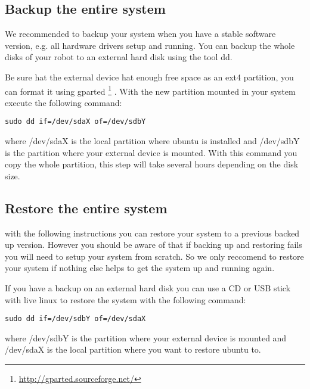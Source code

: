 \subsection{Backup the entire system}  
We recommended to backup your system when you have a stable software version, e.g. all hardware drivers setup and running. You can backup the whole disks of your robot to an external hard disk using the tool dd.

Be sure hat the external device hat enough free space as an ext4 partition, you can format it using gparted \footnote{\url{http://gparted.sourceforge.net/}} . With the new partition mounted in your system execute the following command:
\begin{lstlisting}
sudo dd if=/dev/sdaX of=/dev/sdbY
\end{lstlisting}
where /dev/sdaX is the local partition where ubuntu is installed and /dev/sdbY is the partition where your external device is mounted. With this command you copy the whole partition, this step will take several hours depending on the disk size.

\subsection{Restore the entire system}
with the following instructions you can restore your system to a previous backed up version. However you should be aware of that if backing up and restoring fails you will need to setup your system from scratch. So we only reccomend to restore your system if nothing else helps to get the system up and running again. 

If you have a backup on an external hard disk you can use a CD or USB stick with live linux to restore the system with the following command:
\begin{lstlisting}
sudo dd if=/dev/sdbY of=/dev/sdaX
\end{lstlisting}
where /dev/sdbY is the partition where your external device is mounted and /dev/sdaX is the local partition where you want to restore ubuntu to.


